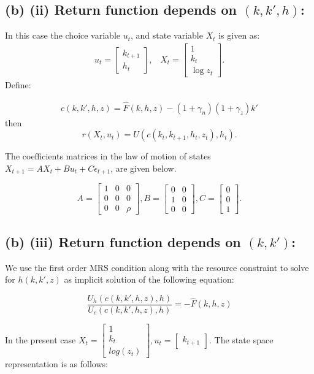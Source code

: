 \documentclass[12pt]{article}
\begin{document}
\subsection{(b) (ii) Return function depends on $(k, k', h)$:}
In this case the choice variable $u_t$, and state variable $X_t$ is given as:
\begin{align*}
	u_t = \begin{bmatrix}
		k_{t+1} \\
		h_t
	\end{bmatrix}, \; \; \; X_{t} = \begin{bmatrix}
		1 \\
		k_t\\
		\log z_t
	\end{bmatrix}.
	\end{align*}
Define:

\begin{gather*}
c(k, k', h, z) =  \hat{F}(k, h, z) - (1+\gamma_n)(1+\gamma_z)k'
\end{gather*}
then $$r(X_t, u_t) = U(c(k_t, k_{t+1}, h_t, z_t), h_t).
$$

The coefficients matrices in the law of motion of states $X_{t+1} = A X_t + Bu_t + C\epsilon_{t+1}$, are given below.


$$A= \begin{bmatrix}
1 & 0 & 0\\ 0 & 0 & 0 \\ 0 & 0 & \rho \end{bmatrix}, 
B = \begin{bmatrix} 0 & 0\\ 1 & 0 \\ 0 & 0 \end{bmatrix},
C = \begin{bmatrix} 0 \\ 0 \\  1 \end{bmatrix} .$$


\subsection{(b) (iii) Return function depends on $(k, k')$:}
We use the first order MRS condition along with the resource constraint to solve for $h(k, k', z)$ as implicit solution of the following equation:

 $$\frac{U_h(c(k, k', h, z), h)}{U_c(c(k, k', h, z), h)} = -\hat{F}(k, h, z)$$ 

In the present case $X_t = \begin{bmatrix} 1 \\ k_t \\ log(z_t)\end{bmatrix}, u_t = \begin{bmatrix}k_{t+1} \end{bmatrix}$. The state space representation is as follows:
\end{document}
